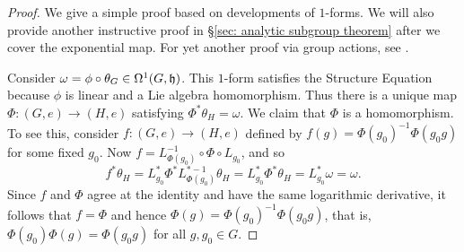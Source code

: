 \begin{proof}
    We give a simple proof based on developments of $1$-forms. We will also provide another instructive proof in \S\ref{sec: analytic subgroup theorem} after we cover the exponential map. For yet another proof via group actions, see \cite[Thm.~20.19]{Lee}.

    Consider $\omega=\phi\circ \theta_G\in \Omega^1(G,\mathfrak{h})$. This $1$-form satisfies the Structure Equation because $\phi$ is linear and a Lie algebra homomorphism. Thus there is a unique map $\Phi:(G,e)\to (H,e)$ satisfying $\Phi^\ast \theta_H=\omega$. We claim that $\Phi$ is a homomorphism. To see this, consider $f:(G,e)\to (H,e)$ defined by $f(g)=\Phi(g_0)^{-1}\Phi(g_0g)$ for some fixed $g_0$. Now $f=L_{\Phi(g_0)}^{-1}\circ\Phi\circ L_{g_0}$, and so
    \[f^\ast\theta_H=L_{g_0}^\ast \Phi^\ast L_{\Phi(g_0)}^{\ast-1}\theta_H=L_{g_0}^\ast \Phi^\ast\theta_H=L_{g_0}^\ast \omega=\omega.\]
    Since $f$ and $\Phi$ agree at the identity and have the same logarithmic derivative, it follows that $f=\Phi$ and hence $\Phi(g)=\Phi(g_0)^{-1}\Phi(g_0g)$, that is, $\Phi(g_0)\Phi(g)=\Phi(g_0g)$ for all $g,g_0\in G$.


\end{proof}
